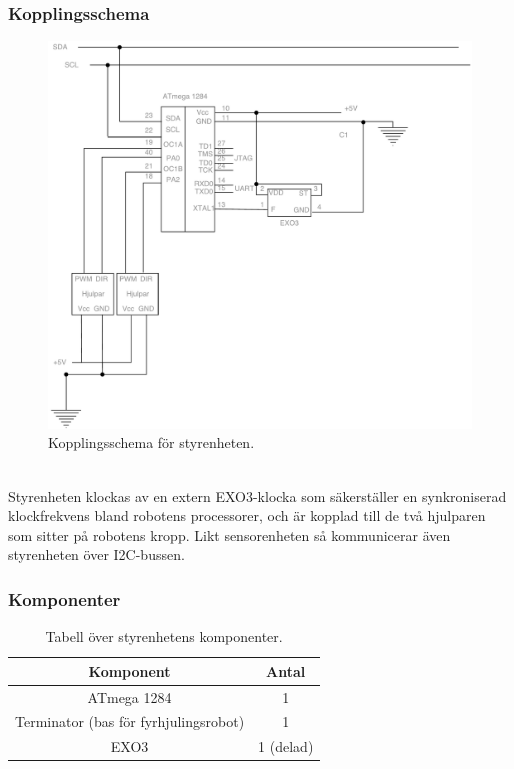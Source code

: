 \documentclass{article}
\begin{document}
\subsubsection{Kopplingsschema}
\begin{figure}[H]
\centering
\includegraphics[scale=0.45]{Styrenhet_kopplingsschema}
\caption{Kopplingsschema för styrenheten.}
\label{fig:styrenhet_kopplingsschema}
\end{figure}
\ \\
Styrenheten klockas av en extern EXO3-klocka som säkerställer en synkroniserad klockfrekvens bland robotens processorer, och är kopplad till de två hjulparen som sitter på robotens kropp. Likt sensorenheten så kommunicerar även styrenheten över I2C-bussen.

\subsubsection{Komponenter}

\begin{table}[H]
  \centering
  \caption{Tabell över styrenhetens komponenter.}
  \begin{tabular}{ | c | c |}
    \hline
    \textbf{Komponent} & \textbf{Antal} \\
    \hline
    ATmega 1284 & 1 \\
    \hline
    Terminator (bas för fyrhjulingsrobot) & 1 \\
    \hline
    EXO3 & 1 (delad) \\
    \hline
  \end{tabular}
  \label{table:styr_komponenter}
\end{table}
\end{document}
